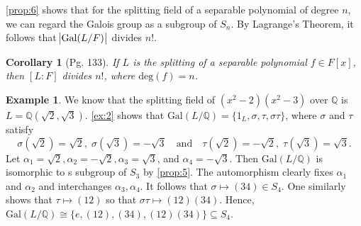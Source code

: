 \documentclass[leqno]{article}
\newtheorem{corollary}{Corollary}
\theoremstyle{definition}
\theoremstyle{remark}
\theoremstyle{definition}
\newtheorem{example}{Example}
\begin{document}
    \cref{prop:6} shows that for the splitting field of a separable polynomial of degree $n$, we can regard the Galois group as a subgroup of $S_n$. By Lagrange's Theorem, it follows that $\abs{\text{Gal}(L/F)}$ divides $n!$.
    \begin{corollary}[Pg. 133]\label{cor:3}
        If $L$ is the splitting of a separable polynomial $f\in F[x]$, then $[L\colon F]$ divides $n!$, where $\text{deg}(f)=n$.
    \end{corollary}
    \begin{example}\label{ex:3}
        We know that the splitting field of $(x^2-2)(x^2-3)$ over $\mathbb{Q}$ is $L=\mathbb{Q}(\sqrt{2},\sqrt{3})$. \cref{ex:2} shows that $\text{Gal}(L/\mathbb{Q})=\{1_L,\sigma,\tau,\sigma\tau\}$, where $\sigma$ and $\tau$ satisfy
            \begin{equation*}
                \sigma(\sqrt{2})=\sqrt{2},\;\sigma(\sqrt{3})=-\sqrt{3}\quad\text{and}\quad\tau(\sqrt{2})=-\sqrt{2},\;\tau(\sqrt{3})=\sqrt{3}.
            \end{equation*}
        Let $\alpha_1=\sqrt{2},\alpha_2=-\sqrt{2},\alpha_3=\sqrt{3}$, and $\alpha_4=-\sqrt{3}$. Then $\text{Gal}(L/\mathbb{Q})$ is isomorphic to s subgroup of $S_3$ by \cref{prop:5}. The automorphism clearly fixes $\alpha_1$ and $\alpha_2$ and interchanges $\alpha_3,\alpha_4$. It follows that $\sigma\mapsto (34)\in S_4$. One similarly shows that $\tau\mapsto (12)$ so that $\sigma\tau\mapsto(12)(34)$. Hence, $\text{Gal}(L/\mathbb{Q})\cong\{e,(12),(34),(12)(34)\}\subseteq S_4$.
    \end{example}
\end{document}
